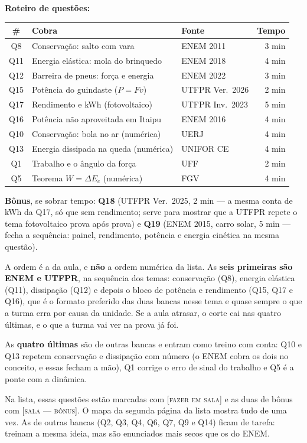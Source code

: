 \documentclass[11pt,a4paper]{article}
\begin{document}
\begin{quadro}
\textbf{Roteiro de quest\~oes:}

\medskip
{\small
\begin{tabular}{@{}cllr@{}}
  \toprule
  \# & Cobra & Fonte & Tempo \\
  \midrule
  Q8  & Conserva\c{c}\~ao: salto com vara           & ENEM 2011          & 3 min \\
  Q11 & Energia el\'astica: mola do brinquedo       & ENEM 2018          & 4 min \\
  Q12 & Barreira de pneus: for\c{c}a e energia      & ENEM 2022          & 3 min \\
  Q15 & Pot\^encia do guindaste ($P = Fv$)          & UTFPR Ver.\ 2026   & 2 min \\
  Q17 & Rendimento e kWh (fotovoltaico)             & UTFPR Inv.\ 2023   & 5 min \\
  Q16 & Pot\^encia n\~ao aproveitada em Itaipu      & ENEM 2016          & 4 min \\[0.4em]
  Q10 & Conserva\c{c}\~ao: bola no ar (num\'erica)  & UERJ               & 4 min \\
  Q13 & Energia dissipada na queda (num\'erica)     & UNIFOR CE          & 4 min \\
  Q1  & Trabalho e o \^angulo da for\c{c}a          & UFF                & 2 min \\
  Q5  & Teorema $W = \Delta E_c$ (num\'erica)       & FGV                & 4 min \\
  \bottomrule
\end{tabular}}

\medskip
\textbf{B\^onus}, se sobrar tempo: \textbf{Q18} (UTFPR Ver.\ 2025,
2 min --- a mesma conta de kWh da Q17, s\'o que sem rendimento; serve
para mostrar que a UTFPR repete o tema fotovoltaico prova ap\'os
prova) e \textbf{Q19} (ENEM 2015, carro solar, 5 min --- fecha a
sequ\^encia: painel, rendimento, pot\^encia e energia cin\'etica na
mesma quest\~ao).

\medskip
A ordem \'e a da aula, e \textbf{n\~ao} a ordem num\'erica da lista.
As \textbf{seis primeiras s\~ao ENEM e UTFPR}, na sequ\^encia dos
temas: conserva\c{c}\~ao (Q8), energia el\'astica (Q11),
dissipa\c{c}\~ao (Q12) e depois o bloco de pot\^encia e rendimento
(Q15, Q17 e Q16), que \'e o formato preferido das duas bancas nesse
tema e quase sempre o que a turma erra por causa da unidade. Se a
aula atrasar, o corte cai nas quatro \'ultimas, e o que a turma vai
ver na prova j\'a foi.

\medskip
As \textbf{quatro \'ultimas} s\~ao de outras bancas e entram como
treino com conta: Q10 e Q13 repetem conserva\c{c}\~ao e
dissipa\c{c}\~ao com n\'umero (o ENEM cobra os dois no conceito, e
essas fecham a m\~ao), Q1 corrige o erro de sinal do trabalho e Q5 \'e
a ponte com a din\^amica.

\medskip
Na lista, essas quest\~oes est\~ao marcadas com
{\scshape\color{vinho}[fazer em sala]} e as duas de b\^onus com
{\scshape\color{vinho}[sala --- b\^onus]}. O mapa da segunda p\'agina
da lista mostra tudo de uma vez. As de outras bancas (Q2, Q3, Q4, Q6,
Q7, Q9 e Q14) ficam de tarefa: treinam a mesma ideia, mas s\~ao
enunciados mais secos que os do ENEM.
\end{quadro}
\end{document}
